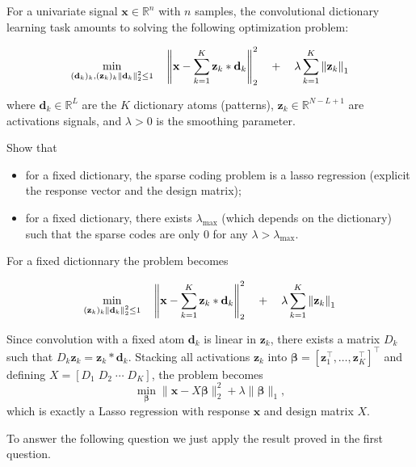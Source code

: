 \documentclass[11pt]{article}
\begin{document}
\begin{exercise}
For a univariate signal $\mathbf{x}\in\mathbb{R}^n$ with $n$ samples, the convolutional dictionary learning task amounts to solving the following optimization problem:

\begin{equation}
\min_{(\mathbf{d}_k)_k, (\mathbf{z}_k)_k \\ \left\lVert\mathbf{d}_k\right\rVert_2^2\leq 1} \quad\left\lVert\mathbf{x} - \sum_{k=1}^K \mathbf{z}_k * \mathbf{d}_k \right\rVert^2_2 \quad + \quad\lambda \sum_{k=1}^K \left\lVert\mathbf{z}_k\right\rVert_1
\end{equation}

where $\mathbf{d}_k\in\mathbb{R}^L$ are the $K$ dictionary atoms (patterns), $\mathbf{z}_k\in\mathbb{R}^{N-L+1}$ are activations signals, and $\lambda>0$ is the smoothing parameter.

Show that
\begin{itemize}
    \item for a fixed dictionary, the sparse coding problem is a lasso regression (explicit the response vector and the design matrix);
    \item for a fixed dictionary, there exists $\lambda_{\max}$ (which depends on the dictionary) such that the sparse codes are only 0 for any $\lambda > \lambda_{\max}$. 
\end{itemize}
\end{exercise}

\begin{solution}  %

For a fixed dictionnary the problem becomes

\begin{equation*}
\min_{(\mathbf{z}_k)_k \\ \left\lVert\mathbf{d}_k\right\rVert_2^2\leq 1} \quad\left\lVert\mathbf{x} - \sum_{k=1}^K \mathbf{z}_k * \mathbf{d}_k \right\rVert^2_2 \quad + \quad\lambda \sum_{k=1}^K \left\lVert\mathbf{z}_k\right\rVert_1
\end{equation*}

Since convolution with a fixed atom $\mathbf{d}_k$ is linear in $\mathbf{z}_k$, there exists a matrix 
$D_k$ such that $D_k \mathbf{z}_k = \mathbf{z}_k * \mathbf{d}_k$.
Stacking all activations $\mathbf{z}_k$ into 
$\boldsymbol{\beta} = [\mathbf{z}_1^\top,\dots,\mathbf{z}_K^\top]^\top$
and defining 
$X = [D_1 \; D_2 \; \cdots \; D_K]$, the problem becomes
\[
\min_{\boldsymbol{\beta}} 
\|\mathbf{x} - X\boldsymbol{\beta}\|_2^2 + \lambda \|\boldsymbol{\beta}\|_1,
\]
which is exactly a Lasso regression with response $\mathbf{x}$ and design matrix $X$.

To answer the following question we just apply the result proved in the first question. 



\end{solution}
\end{document}
